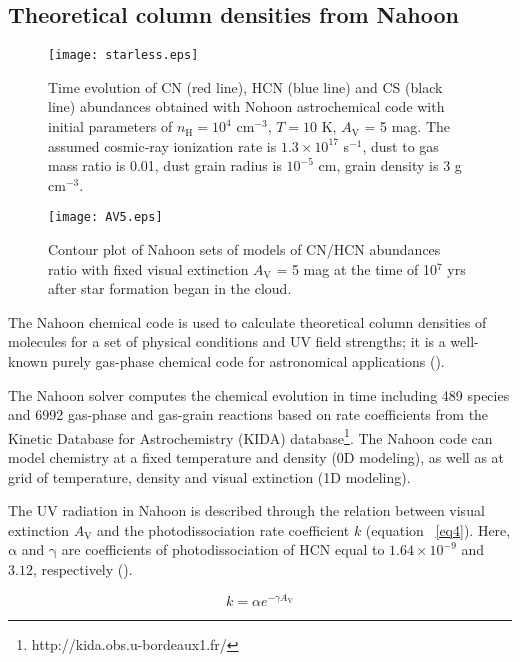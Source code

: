 \documentclass{aa}
\begin{document}
\subsection{Theoretical column densities from Nahoon}
\begin{figure} 
\centering 
\texttt{[image: starless.eps]} 
\caption{Time evolution of CN
(red line), HCN (blue line) and CS (black line) abundances obtained with Nohoon astrochemical code
with initial parameters of $n_\mathrm{H} = 10^4$ cm$^{-3}$, $T = 10$ K, $A_\mathrm{V}$ =
5 mag. The assumed cosmic-ray ionization rate is $1.3\times10^{17}$ s$^{-1}$, dust to gas mass ratio
is 0.01, dust grain radius is $10^{-5}$ cm, grain density is 3 g cm$^{-3}$.} 
\label{starless}
\end{figure}
\begin{figure} 
\centering 
\texttt{[image: AV5.eps]} 
\caption{Contour plot of Nahoon sets
of models of CN/HCN abundances ratio with fixed visual extinction $A_\mathrm{V}$ = 5 mag at the time
of 10$^{7}$ yrs after star formation began in the cloud.} 
\label{AV5} 
\end{figure}
The Nahoon chemical code is used to calculate theoretical column densities of 
molecules for a set of physical conditions and UV field strengths; it is a well-known
purely gas-phase chemical code for astronomical applications (\citealt{Wak12}). 

The Nahoon solver computes the chemical evolution in time including 489 species
and 6992 gas-phase and gas-grain reactions based on rate coefficients from the Kinetic
Database for Astrochemistry (KIDA) database\footnote{http://kida.obs.u-bordeaux1.fr/}. 
The Nahoon code can model chemistry at a fixed temperature and density (0D modeling),
 as well as at grid of temperature,
density and visual extinction (1D modeling). 

The UV radiation in Nahoon is described through the relation
between visual extinction $A_\mathrm{V}$ and the photodissociation rate coefficient $k$
(equation ~\ref{eq4}). Here, $\mathrm{\alpha}$ and $\mathrm{\gamma}$ are coefficients
 of photodissociation of HCN equal to $1.64\times10^{-9}$ and $3.12$, respectively (\citep{Hea17}).

\begin{equation} \label{eq5} 
k = \alpha e^{-\gamma A_\mathrm{V}} 
\end{equation} 
\end{document}
